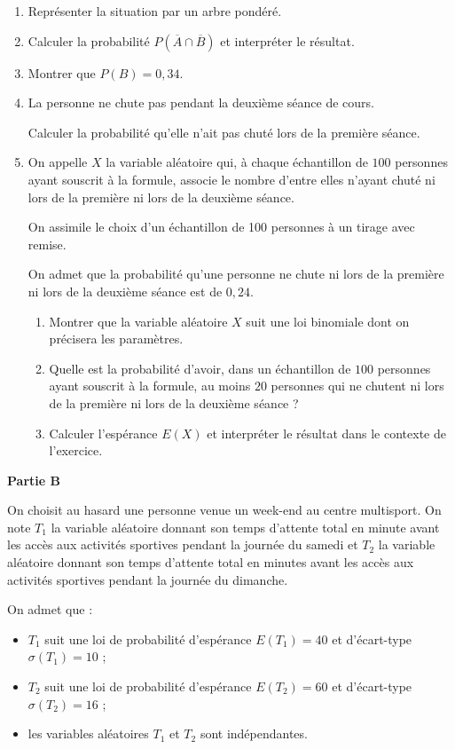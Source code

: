 \begin{enumerate}
\item Représenter la situation par un arbre pondéré.
\item Calculer la probabilité $P \left (\overline{A} \cap \overline{B} \right )$ et interpréter le résultat.
\item Montrer que $P(B) = 0,34$.
\item La personne ne chute pas pendant la deuxième séance de cours.

Calculer la probabilité qu'elle n'ait pas chuté lors de la première séance.
\item On appelle $X$ la variable aléatoire qui, à chaque échantillon de $100$ personnes ayant souscrit à la formule, associe le nombre d'entre elles n'ayant chuté ni lors de la première ni lors de la deuxième séance.

On assimile le choix d'un échantillon de 100 personnes à un tirage avec remise.

On admet que la probabilité qu'une personne ne chute ni lors de la première ni lors de la deuxième séance est de $0,24$.
	\begin{enumerate}
		\item Montrer que la variable aléatoire $X$ suit une loi binomiale dont on précisera les paramètres.
		\item Quelle est la probabilité d'avoir, dans un échantillon de $100$ personnes ayant souscrit à la formule, au moins $20$ personnes qui ne chutent ni lors de la première ni lors de la deuxième séance ?
		\item Calculer l'espérance $E(X)$ et interpréter le résultat dans le contexte de l'exercice.
	\end{enumerate}
\end{enumerate}

\begin{center}\textbf{Partie B} \end{center}

On choisit au hasard une personne venue  un week-end au centre multisport. On note $T_1$ la variable  aléatoire donnant son temps d'attente total en minute avant les accès aux activités sportives pendant la journée du samedi et $T_2$ la variable aléatoire donnant son temps d'attente total en minutes avant les accès aux activités sportives pendant la journée du dimanche.

On admet que :

\begin{itemize}[label=$\bullet~$]
\item $T_1$ suit une loi de probabilité d'espérance $E(T_1) = 40$ et d'écart-type $\sigma(T_1) = 10$ ;
\item $T_2$ suit une loi de probabilité d'espérance $E(T_2) = 60$ et d'écart-type $\sigma(T_2) = 16$ ;
\item  les variables aléatoires $T_1$ et $T_2$ sont indépendantes.
\end{itemize}

